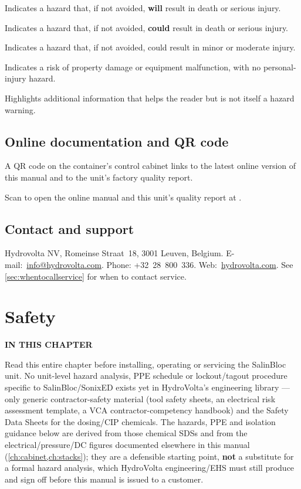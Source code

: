 \documentclass[a4paper,11pt,twoside,openright,numbers=noenddot]{scrreprt}
\newcommand{\chaptertoc}{%
  \begingroup
  \etocsetnexttocdepth{1}%
  \etocsettocstyle
    {{\sffamily\bfseries\footnotesize\color{hvmuted}IN THIS CHAPTER\par}%
     \vspace{5pt}{\color{hvink}\rule{\linewidth}{1.2pt}}\par\vspace{2pt}}{}%
  \etocsetstyle{section}{}{}
    {\par\vspace{4pt}\noindent
     \makebox[11mm][l]{\sffamily\bfseries\small\color{hvprimary}\etocnumber}%
     \sffamily\small\etocname\hfill{\color{hvmuted}\etocpage}%
     \par\vspace{4pt}{\color{hvrule}\rule{\linewidth}{0.4pt}}}{}%
  \localtableofcontents
  \endgroup}
\newcommand{\salinbloc}{SalinBloc\texttrademark\xspace}
\newcommand{\sonixed}{SonixED\texttrademark\xspace}
\newcommand{\hvqr}[2][22mm]{\qrcode[height=#1,level=M]{#2}}
\newcommand{\hvqrbox}[3][22mm]{%
  \begin{tcolorbox}[hvbox, colframe=hvrule, colback=hvpaper]
    \begin{minipage}[c]{#1}\hvqr[#1]{#2}\end{minipage}\hfill
    \begin{minipage}[c]{\dimexpr\linewidth-#1-10pt\relax}\small #3\end{minipage}
  \end{tcolorbox}}
\begin{document}
\begin{danger}
Indicates a hazard that, if not avoided, \textbf{will} result in death or
serious injury.
\end{danger}
\begin{warning}
Indicates a hazard that, if not avoided, \textbf{could} result in death or
serious injury.
\end{warning}
\begin{caution}
Indicates a hazard that, if not avoided, could result in minor or moderate
injury.
\end{caution}
\begin{notice}
Indicates a risk of property damage or equipment malfunction, with no
personal-injury hazard.
\end{notice}
\begin{note}
Highlights additional information that helps the reader but is not itself
a hazard warning.
\end{note}

\section{Online documentation and QR code}
A QR code on the container's control cabinet links to the latest online
version of this manual and to the unit's factory quality report.

\makeatletter
\hvqrbox{\hv@qrurl}{Scan to open the online manual and this unit's
  quality report at \hv@qrurl.}
\makeatother

\section{Contact and support}
Hydrovolta NV, Romeinse Straat~18, 3001 Leuven, Belgium.
E-mail:~\href{mailto:info@hydrovolta.com}{info@hydrovolta.com}. Phone:
+32~28~800~336. Web:~\href{https://hydrovolta.com}{hydrovolta.com}. See
\cref{sec:whentocallservice} for when to contact service.


\chapter{Safety}
\label{ch:safety}
\chaptertoc

\begin{warning}
Read this entire chapter before installing, operating or servicing the
\salinbloc unit. No unit-level hazard analysis, PPE schedule or
lockout/tagout procedure specific to \salinbloc/\sonixed exists yet in
HydroVolta's engineering library --- only generic contractor-safety
material (tool safety sheets, an electrical risk assessment template, a
VCA contractor-competency handbook) and the Safety Data Sheets for the
dosing/CIP chemicals. The hazards, PPE and isolation guidance below are
derived from those chemical SDSs and from the electrical/pressure/DC
figures documented elsewhere in this manual (\cref{ch:cabinet,ch:stacks});
they are a defensible starting point, \textbf{not} a substitute for a
formal hazard analysis, which HydroVolta engineering/EHS must still
produce and sign off before this manual is issued to a customer.
\end{warning}
\end{document}
